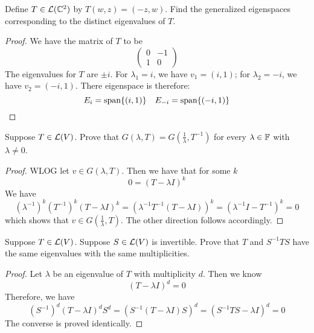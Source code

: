 \documentclass{extarticle}
\begin{document}

\newpage 
{}

\begin{problem}{1}
    Define \(T \in \mathcal{L}(\mathbb{C}^2)\) by \(T(w, z) = (-z, w)\). Find the generalized eigenspaces 
    corresponding to the distinct eigenvalues of \(T\).
\end{problem}

\begin{proof}
We have the matrix of \(T\) to be 
\[\begin{pmatrix}
    0 & -1 \\ 
    1 & 0
\end{pmatrix}\]
The eigenvalues for \(T\) are \(\pm i\). For \(\lambda_1 = i\), we have \(v_1 = (i, 1)\); for 
\(\lambda_2 = - i\), we have \(v_2 = (-i, 1)\). There eigenspace is therefore:
\[E_{i} = \text{span}\{(i, 1)\} \ \ \ E_{-i} = \text{span}\{(-i, 1)\}\]
\end{proof}

\begin{problem}{2}
    Suppose \(T \in \mathcal{L}(V)\). Prove that \(G(\lambda, T) = G(\frac{1}{\lambda}, T^{-1})\) for 
    every \(\lambda \in \mathbb{F}\) with \(\lambda \neq 0\). 
\end{problem}

\begin{proof}
WLOG let \(v \in G(\lambda, T)\). Then we have that for some \(k\)
\[0 = (T - \lambda I)^k\]
We have 
\[(\lambda^{-1})^k (T^{-1})^k (T - \lambda I)^k 
= (\lambda^{-1}T^{-1}(T - \lambda I))^k = (\lambda^{-1} I - T^{-1})^k = 0\]
which shows that \( v \in G(\frac{1}{\lambda}, T)\). The other direction follows accordingly. 
\end{proof}

\begin{problem}{3}
    Suppose \(T \in \mathcal{L}(V)\). Suppose \(S \in \mathcal{L}(V)\) is invertible. Prove that \(T\)
    and \(S^{-1}TS\) have the same eigenvalues with the same multiplicities.
\end{problem}

\begin{proof}
Let \(\lambda\) be an eigenvalue of \(T\) with multiplicity \(d\). Then we know 
\[(T - \lambda I)^d = 0\]
Therefore, we have
\[(S^{-1})^d (T - \lambda I)^d S^d = (S^{-1}(T - \lambda I) S)^d = (S^{-1}TS - \lambda I)^d = 0\]
The converse is proved identically. 
\end{proof}
\end{document}
